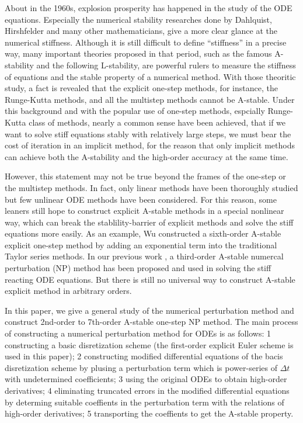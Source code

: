 \documentclass[review]{elsarticle}
\theoremstyle{plain}\newtheorem{definition}{\sc{Definition}}
\theoremstyle{defination}\newtheorem{example}{Example}[section]
\numberwithin{equation}{section}
\numberwithin{table}{section}
\begin{document}
{  About in the 1960s, explosion prosperity has happened in the study of the ODE equations. Especially the numerical stability researches done by Dahlquist, Hirshfelder and many other mathematicians, give a more clear glance at the numerical stiffness. Although it is still  difficult to define ``stiffness'' in a precise way, many important theories proposed in that period, such as the famous A-stability\cite{Germund1963A} and the following L-stability\cite{ehle1969pade}, are powerful rulers to measure the stiffness of equations and the stable property of a numerical method. With those theoritic study, a fact is revealed that the explicit one-step methods, for instance, the Runge-Kutta methods, and all the multistep methods cannot be A-stable. Under this background and with the popular use of one-step methods, espcially Runge-Kutta class of methods, nearly a common sense have been achieved, that if we want to solve stiff equations stably  with relatively large steps, we must bear the cost of iteration in an implicit method, for the reason that only implicit methods can achieve both  the A-stability and the  high-order accuracy at the same time.  

  However, this statement may not be true beyond the frames of the  one-step or the multistep methods. In fact, only linear methods have been thoroughly studied but few unlinear ODE methods have been considered. For this reason, some leaners still  hope to construct explicit A-stable methods in a special nonlinear way, which can  break the stablility-barrier of explicit methods and solve the stiff equations more easily. As an example,  Wu\cite{Wu1998A,Wu2000The} constructed a sixth-order A-stable explicit one-step method by adding an exponential term into the traditional Taylor series methods\cite{Barrio2005Performance,Barrio2011Breaking}. In our previous work \cite{Liu2017The}, a third-order A-stable numercal perturbation (NP) method has been proposed and used in solving  the stiff reacting ODE equations. But there is still no universal way to construct A-stable explicit method in arbitrary orders. 

In this paper, we give a general study of the numerical perturbation method and construct 2nd-order to 7th-order A-stable one-step NP method. 
The main  process of constructing a numerical perturbation method for ODEs is as follows: \textcircled{\small{1}} constructing a basic disretization scheme (the first-order explicit Euler scheme is used in this paper); \textcircled{\small{2}} constructing modified differential equations of the bacis disretization scheme by plusing a perturbation term which is power-series of $\Delta t$ with undetermined coefficients; \textcircled{\small{3}} using the original ODEs to obtain high-order derivatives; \textcircled{\small{4}} eliminating truncated errors in the modified differential equations by determing suitable coeffients in the perturbation term with the relations of high-order derivatives; \textcircled{\small{5}} transporting the coeffients to get the  A-stable property.               

}
\end{document}

